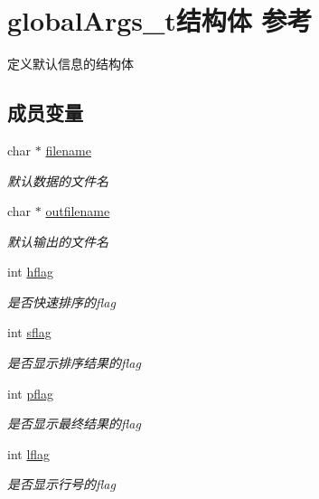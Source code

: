 \hypertarget{structglobal_args__t}{\section{global\-Args\-\_\-t结构体 参考}
\label{structglobal_args__t}
}


定义默认信息的结构体  


\subsection*{成员变量}
\begin{DoxyCompactItemize}
\item 
char $\ast$ \hyperlink{structglobal_args__t_aeac90097f29f7529968697163cea5c18}{filename}
\begin{DoxyCompactList}\small\item\em 默认数据的文件名 \end{DoxyCompactList}\item 
char $\ast$ \hyperlink{structglobal_args__t_aa40c5c56cd04686687e0cd71d52ea78b}{outfilename}
\begin{DoxyCompactList}\small\item\em 默认输出的文件名 \end{DoxyCompactList}\item 
int \hyperlink{structglobal_args__t_a6fe8b762116512ab777118cd3e043200}{hflag}
\begin{DoxyCompactList}\small\item\em 是否快速排序的flag \end{DoxyCompactList}\item 
int \hyperlink{structglobal_args__t_acecd9ebff44a84e2d866ebc2e5e06da7}{sflag}
\begin{DoxyCompactList}\small\item\em 是否显示排序结果的flag \end{DoxyCompactList}\item 
int \hyperlink{structglobal_args__t_a3bf178baaa87d9153b6ef764640fe960}{pflag}
\begin{DoxyCompactList}\small\item\em 是否显示最终结果的flag \end{DoxyCompactList}\item 
int \hyperlink{structglobal_args__t_a4cc7e6867b564ffab9f569351d574a67}{lflag}
\begin{DoxyCompactList}\small\item\em 是否显示行号的flag \end{DoxyCompactList}\item 

\end{DoxyCompactItemize}
